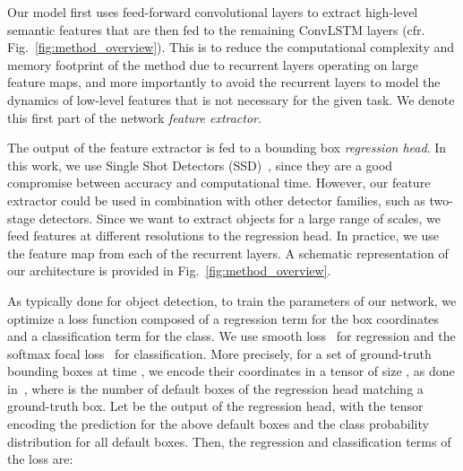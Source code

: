 \documentclass{article}
\newcommand{\JonathanMrmk}[1]{{\color{teal} {\bf jm: #1}}}
\newcommand{\comment}[1]{}
\begin{document}
\comment{We notice that we would like the internal state of our network to correspond to high-level and semantic features, changing slowly over time. By contrast, local or fast-changing features can be addressed via feed-forward layers. \JonathanMrmk{if hidden is smooth output FC cannot be jumpy unless unstable. careful here. do we need this sentence?}
For these reasons, in our network we first stack  feed-forward convolutional layers and then we introduce the ConvLSTM layers for the  consecutive ones (cfr. Fig.~\ref{fig:method_overview}). 
}
Our model first uses  feed-forward convolutional layers to extract high-level semantic features that are then fed to the remaining  ConvLSTM layers
(cfr. Fig.~\ref{fig:method_overview}). 
This is to reduce the computational complexity and memory footprint of the method due to 
recurrent layers operating on large feature maps, and more importantly to avoid the recurrent 
layers to model the dynamics of low-level features that is not necessary for the given task.
We denote this first part of the network \textit{feature extractor}.


The output of the feature extractor is fed to a bounding box  \textit{regression head}. In this work, we use Single Shot Detectors (SSD)~\cite{liu2016ssd}, since they are a good compromise between accuracy and computational time. However, our feature extractor could be used in combination with other detector families, such as two-stage detectors. 
Since we want to extract objects for a large range of scales, we feed features at 
different resolutions to the regression head. In practice, we use the feature map from
each of the recurrent layers.
A schematic representation of our architecture is provided in
Fig.~\ref{fig:method_overview}.









As typically done for object detection, to train the parameters of our network, we optimize a loss function composed of a regression term  for the box coordinates and 
a classification term  for the class.
We use smooth  loss~\cite{liu2016ssd}  for regression and the softmax focal loss~\cite{lin2017focal} for classification.
More precisely, for a set of  ground-truth bounding boxes at time , we encode their coordinates in a tensor  of size , as done in~\cite{liu2016ssd}, where  is the number of default boxes of the regression head matching a ground-truth box.
Let  be the output of the regression head, with  the tensor encoding the prediction for the above  default boxes and  the class probability distribution for all default boxes.
Then, the regression and classification terms of the loss are:
\end{document}
